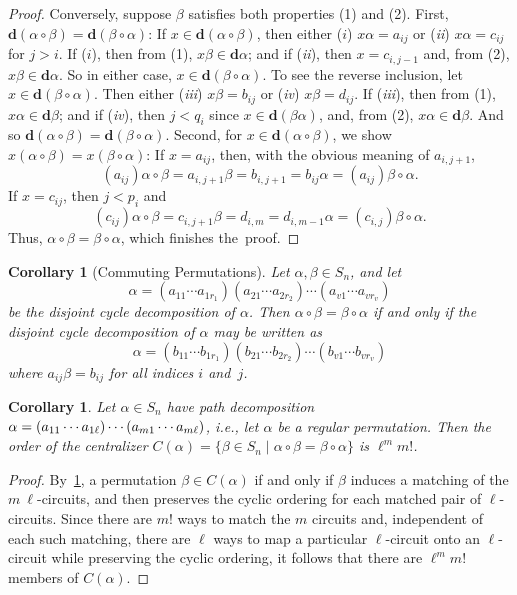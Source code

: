 \documentclass{surv-l}
\numberwithin{equation}{section}
\numberwithin{table}{section}
\numberwithin{figure}{section}
\newtheorem{corollary}[equation]{Corollary}
\theoremstyle{definition}
\begin{document}
\begin{proof}
Conversely, suppose $\beta$ satisfies both properties (1) and (2).
First, $\mathbf{d}(\alpha \circ \beta)=\mathbf{d}(\beta
\circ\alpha)$: If $x\in \mathbf{d}(\alpha \circ\beta)$, then
either ($i$) $x\alpha=a_{ij}$ or (\emph{ii}) $x\alpha=c_{ij}$ for
$j>i$. If ($i$), then from (1), $x\beta\in \mathbf{d}\alpha$;
and if (\emph{ii}), then $x=c_{i,j-1}$ and, from (2), $x\beta\in
\mathbf{d}\alpha$. So in either case, $x\in \mathbf{d}(\beta
\circ\alpha)$. To see the reverse inclusion, let $x\in
\mathbf{d}(\beta \circ\alpha)$. Then either (\emph{iii})
$x\beta=b_{ij}$ or (\emph{iv}) $x\beta=d_{ij}$. If (\emph{iii}),
then from (1), $ x\alpha\in \mathbf{d}\beta$; and if (\emph{iv}),
then $j<q_{i}$ since $x\in \mathbf{d}(\beta\alpha)$, and, from
(2), $ x\alpha\in \mathbf{d}\beta$. And so $\mathbf{d}(\alpha
\circ\beta)=\mathbf{d}(\beta \circ\alpha)$. Second, for $x\in
\mathbf{d}(\alpha \circ\beta)$, we show $x(\alpha
\circ\beta)=x(\beta \circ\alpha)$: If $x=a_{ij}$, then, with the
obvious meaning of $a_{i,j+1}$,
\[
(a_{ij})\alpha\circ\beta=a_{i,j+1}\beta=b_{i,j+1}=b_{ij}\alpha=(a_{ij})\beta\circ\alpha.
\]
If $x=c_{ij}$, then $j<p_{i}$ and
\[
(c_{ij})\alpha \circ\beta=c_{i,j+1}\beta=d_{i,m}=d_{i,m-1}\alpha=(c_{i,j})\beta\circ\alpha.
\]
Thus, $\alpha \circ\beta=\beta \circ\alpha$, which finishes
the~proof.
\end{proof}

\setcounter{equation}{7}
\begin{corollary}[Commuting Permutations]\label{cor3.10.8}
Let $\alpha,\beta\in S_{n}$, and let
\[
\alpha=(a_{11}\cdots a_{1r_{1}})(a_{21}\cdots a_{2r_{2}})\cdots(a_{v1}\cdots a_{vr_{v}})
\]
be the disjoint cycle decomposition of $\alpha$. Then $\alpha
\circ\beta=\beta \circ\alpha$ if and only if the disjoint cycle
decomposition of $\alpha$ may be written as
\[
\alpha=(b_{11}\cdots b_{1r_{1}})(b_{21}\cdots b_{2r_{2}})\cdots(b_{v1}\cdots b_{vr_{v}})
\]
where $a_{ij}\beta=b_{ij}$ for all indices $i$ and~$j$.
\end{corollary}

\begin{corollary}\label{cor3.10.9}
Let $\alpha\in S_{n}$ have path decomposition
$\alpha=(a_{11}\cdots a_{1\ell})\cdots\break (a_{m1}\cdots
a_{m\ell})$, i.e., let $\alpha$ be a regular permutation. Then the
order of the centralizer $C(\alpha)= \{\beta\in
S_{n}\mid \alpha \circ\beta=\beta \circ\alpha\}$ is $\ell^{m}m!$.
\end{corollary}

\begin{proof} By~\ref{cor3.10.8}, a permutation $\beta\in C(\alpha)$ if and only if
$\beta$ induces a matching of the $m\ \ell$-circuits, and then
preserves the cyclic ordering for each matched pair of
$\ell$-circuits. Since there are $m!$ ways to match the $m$
circuits and, independent of each such matching, there are $\ell$
ways to map a particular $\ell$-circuit onto an $\ell$-circuit
while preserving the cyclic ordering, it follows that there are
$\ell^{m}m!$ members of $C(\alpha).$
\end{proof}
\end{document}
